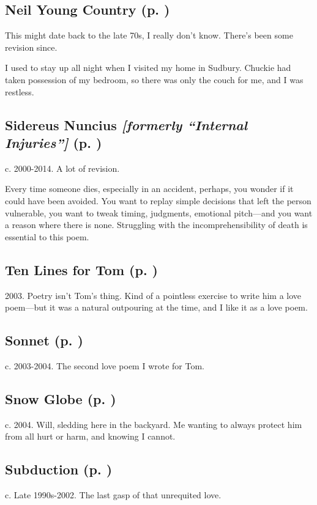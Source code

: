 \subsection*{Neil Young Country (p. \pageref{ch:neil_young_country})}
This might date back to the late 70s, I really don't know. There's been
some revision since.

I used to stay up all night when I
visited my home in Sudbury. Chuckie had taken possession of my bedroom,
so there was only the couch for me, and I was
restless.

\subsection*{Sidereus Nuncius \textit{[formerly ``Internal Injuries'']} (p. \pageref{ch:siderius_nuncius})}
c. 2000-2014. A lot of revision.

Every time someone dies, especially in an accident, perhaps, you wonder if it could have
been avoided. You want to replay simple decisions that left the person
vulnerable, you want to tweak timing, judgments, emotional pitch---and
you want a reason where there is none. Struggling with the
incomprehensibility of death is essential to this poem.

\subsection*{Ten Lines for Tom (p. \pageref{ch:ten_lines})}
2003. Poetry isn't Tom's thing. Kind of a pointless
exercise to write him a love poem---but it was a natural outpouring at
the time, and I like it as a love poem.

\subsection*{Sonnet (p. \pageref{ch:sonnet})}
c. 2003-2004. The second love poem I wrote for Tom.

\subsection*{Snow Globe (p. \pageref{ch:snow_globe})}
c. 2004. Will, sledding here in the backyard. Me wanting
to always protect him from all hurt or harm, and knowing I
cannot.

\subsection*{Subduction (p. \pageref{ch:subduction})}
c. Late 1990s-2002. The last gasp of that unrequited
love.


